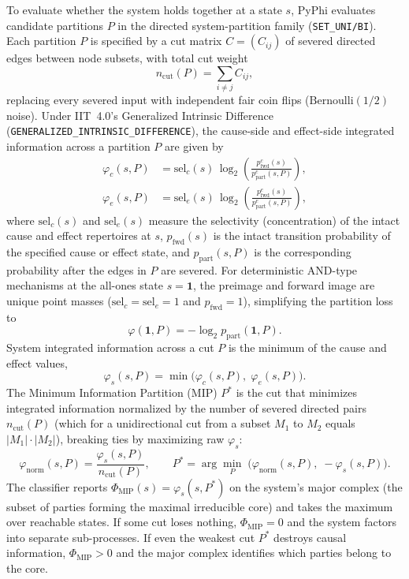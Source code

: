 \documentclass[11pt,a4paper]{article}
\begin{document}
To evaluate whether the system holds together at a state $s$, PyPhi evaluates candidate partitions $P$ in the directed system-partition family (\texttt{SET\_UNI/BI}). Each partition $P$ is specified by a cut matrix $C = (C_{ij})$ of severed directed edges between node subsets, with total cut weight
\begin{equation}
  n_{\mathrm{cut}}(P) = \sum_{i \neq j} C_{ij}, \label{eq:ncut}
\end{equation}
replacing every severed input with independent fair coin flips ($\mathrm{Bernoulli}(1/2)$ noise). Under IIT~4.0's Generalized Intrinsic Difference (\texttt{GENERALIZED\_INTRINSIC\_DIFFERENCE}), the cause-side and effect-side integrated information across a partition $P$ are given by
\begin{align}
  \varphi_c(s, P) &= \mathrm{sel}_c(s)\,\log_2\!\left(\frac{p_{\mathrm{fwd}}^{c}(s)}{p_{\mathrm{part}}^{c}(s, P)}\right), \label{eq:phi_c}\\[0.3em]
  \varphi_e(s, P) &= \mathrm{sel}_e(s)\,\log_2\!\left(\frac{p_{\mathrm{fwd}}^{e}(s)}{p_{\mathrm{part}}^{e}(s, P)}\right), \label{eq:phi_e}
\end{align}
where $\mathrm{sel}_c(s)$ and $\mathrm{sel}_e(s)$ measure the selectivity (concentration) of the intact cause and effect repertoires at $s$, $p_{\mathrm{fwd}}(s)$ is the intact transition probability of the specified cause or effect state, and $p_{\mathrm{part}}(s, P)$ is the corresponding probability after the edges in $P$ are severed. For deterministic $\mathrm{AND}$-type mechanisms at the all-ones state $s = \mathbf{1}$, the preimage and forward image are unique point masses ($\mathrm{sel}_c = \mathrm{sel}_e = 1$ and $p_{\mathrm{fwd}} = 1$), simplifying the partition loss to
\begin{equation}
  \varphi(\mathbf{1}, P) = -\log_2 p_{\mathrm{part}}(\mathbf{1}, P). \label{eq:gid_point}
\end{equation}
System integrated information across a cut $P$ is the minimum of the cause and effect values,
\begin{equation}
  \varphi_s(s, P) = \min\!\bigl(\varphi_c(s, P),\; \varphi_e(s, P)\bigr). \label{eq:phi_s}
\end{equation}
The Minimum Information Partition (MIP) $P^*$ is the cut that minimizes integrated information normalized by the number of severed directed pairs $n_{\mathrm{cut}}(P)$ (which for a unidirectional cut from a subset $M_1$ to $M_2$ equals $|M_1|\cdot|M_2|$), breaking ties by maximizing raw $\varphi_s$:
\begin{equation}
  \varphi_{\mathrm{norm}}(s, P) = \frac{\varphi_s(s, P)}{n_{\mathrm{cut}}(P)},
  \qquad
  P^* = \arg\min_{P}\;\bigl(\varphi_{\mathrm{norm}}(s, P),\; -\varphi_s(s, P)\bigr). \label{eq:mip}
\end{equation}
The classifier reports $\Phi_{\mathrm{MIP}}(s) = \varphi_s(s, P^*)$ on the system's major complex (the subset of parties forming the maximal irreducible core) and takes the maximum over reachable states. If some cut loses nothing, $\Phi_{\mathrm{MIP}} = 0$ and the system factors into separate sub-processes. If even the weakest cut $P^*$ destroys causal information, $\Phi_{\mathrm{MIP}} > 0$ and the major complex identifies which parties belong to the core.
\end{document}
